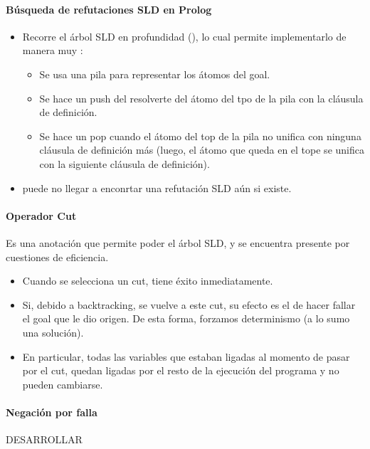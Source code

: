 \paragraph{Búsqueda de refutaciones SLD en Prolog}
\begin{itemize}
  \item Recorre el árbol SLD en profundidad (), lo cual permite implementarlo de manera muy :
  \begin{itemize}
    \item Se usa una pila para representar los átomos del goal.
    \item Se hace un push del resolverte del átomo del tpo de la pila con la cláusula de definición.
    \item Se hace un pop cuando el átomo del top de la pila no unifica con ninguna cláusula de definición más (luego, el átomo que queda en el tope se unifica con la siguiente cláusula de definición).
  \end{itemize}
  \item {} puede no llegar a enconrtar una refutación SLD aún si existe.
\end{itemize}

\paragraph{Operador Cut}

Es una anotación que permite poder el árbol SLD, y se encuentra presente por cuestiones de eficiencia.

\begin{itemize}
  \item Cuando se selecciona un cut, tiene éxito inmediatamente.
  \item Si, debido a backtracking, se vuelve a este cut, su efecto es el de hacer fallar el goal que le dio origen. De esta forma, forzamos determinismo (a lo sumo una solución).
  \item En particular, todas las variables que estaban ligadas al momento de pasar por el cut, quedan ligadas por el resto de la ejecución del programa y no pueden cambiarse.
\end{itemize}

\paragraph{Negación por falla}

DESARROLLAR
